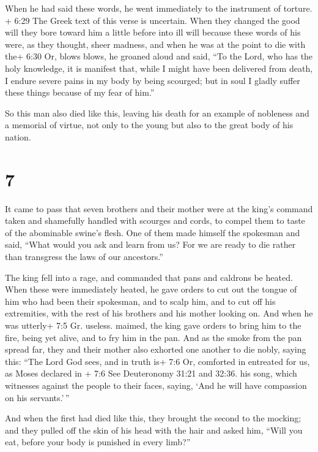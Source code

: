 When he had said these words, he went immediately to the instrument of
torture.  + 6:29 The Greek text of this verse is uncertain.
When they changed the good will they bore toward him a little before
into ill will because these words of his were, as they thought, sheer
madness,  and when he was at the point to die with the+
6:30 Or, blows blows, he groaned aloud and said, ``To the Lord, who has
the holy knowledge, it is manifest that, while I might have been
delivered from death, I endure severe pains in my body by being
scourged; but in soul I gladly suffer these things because of my fear of
him.''

 So this man also died like this, leaving his death for an
example of nobleness and a memorial of virtue, not only to the young but
also to the great body of his nation.

\hypertarget{section-5}{%
\section{7}\label{section-5}}

 It came to pass that seven brothers and their mother were
at the king's command taken and shamefully handled with scourges and
cords, to compel them to taste of the abominable swine's flesh.
 One of them made himself the spokesman and said, ``What
would you ask and learn from us? For we are ready to die rather than
transgress the laws of our ancestors.''

 The king fell into a rage, and commanded that pans and
caldrons be heated.  When these were immediately heated, he
gave orders to cut out the tongue of him who had been their spokesman,
and to scalp him, and to cut off his extremities, with the rest of his
brothers and his mother looking on.  And when he was
utterly+ 7:5 Gr. useless. maimed, the king gave orders to bring him to
the fire, being yet alive, and to fry him in the pan. And as the smoke
from the pan spread far, they and their mother also exhorted one another
to die nobly, saying this:  ``The Lord God sees, and in
truth is+ 7:6 Or, comforted in entreated for us, as Moses declared in +
7:6 See Deuteronomy 31:21 and 32:36. his song, which witnesses against
the people to their faces, saying, `And he will have compassion on his
servants.'\,''

 And when the first had died like this, they brought the
second to the mocking; and they pulled off the skin of his head with the
hair and asked him, ``Will you eat, before your body is punished in
every limb?''

